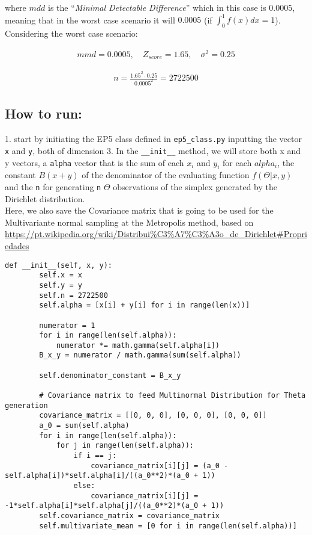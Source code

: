 \documentclass[12pt]{article}
\begin{document}
where $mdd$ is the ``\textit{Minimal Detectable Difference}'' which in this case is $0.0005$, meaning that in the worst case scenario it will $0.0005$ (if $\int_{0}^{1}f(x)dx=1$). Considering the worst case scenario:

\begin{eqnarray}
mmd = 0.0005,\quad Z_{score} = 1.65,\quad \sigma^{2} = 0.25
\end{eqnarray}

\begin{eqnarray}
n = \frac{1.65^{2} \cdot 0.25}{0.0005^{2}} = 2722500
\end{eqnarray}

\subsection*{How to run:}
1. start by initiating the EP5 class defined in \texttt{ep5\_class.py} inputting the vector \texttt{x} and \texttt{y}, both of dimension 3. In the \texttt{\_\_init\_\_} method, we will store both x and y vectors, a \texttt{alpha} vector that is the sum of each $x_i$ and $y_i$ for each $alpha_i$, the constant $B(x + y)$ of the denominator of the evaluating function $f(\Theta|x, y)$ and the \texttt{n} for generating \texttt{n} $\Theta$ observations of the simplex generated by the Dirichlet distribution.\\
Here, we also save the Covariance matrix that is going to be used for the Multivariante normal sampling at the Metropolis method, based on \url{https://pt.wikipedia.org/wiki/Distribui%C3%A7%C3%A3o_de_Dirichlet#Propriedades}

\begin{lstlisting}
def __init__(self, x, y):
		self.x = x
		self.y = y
		self.n = 2722500
		self.alpha = [x[i] + y[i] for i in range(len(x))]

		numerator = 1
		for i in range(len(self.alpha)):
			numerator *= math.gamma(self.alpha[i])
		B_x_y = numerator / math.gamma(sum(self.alpha))

		self.denominator_constant = B_x_y
		
		# Covariance matrix to feed Multinormal Distribution for Theta generation
		covariance_matrix = [[0, 0, 0], [0, 0, 0], [0, 0, 0]]
		a_0 = sum(self.alpha)
		for i in range(len(self.alpha)):
			for j in range(len(self.alpha)):
				if i == j:
					covariance_matrix[i][j] = (a_0 - self.alpha[i])*self.alpha[i]/((a_0**2)*(a_0 + 1))
				else:
					covariance_matrix[i][j] = -1*self.alpha[i]*self.alpha[j]/((a_0**2)*(a_0 + 1))
		self.covariance_matrix = covariance_matrix
		self.multivariate_mean = [0 for i in range(len(self.alpha))]
\end{lstlisting}
\end{document}
